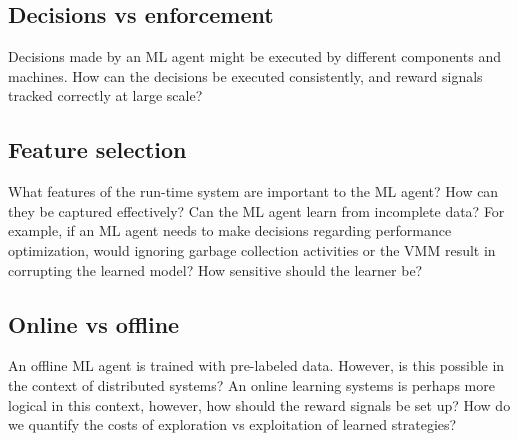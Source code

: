 \documentclass[a4paper,twocolumn]{article}
\begin{document}
\subsection{Decisions vs enforcement}
Decisions made by an ML agent might be executed by different components and
machines. How can the decisions be executed consistently, and reward signals
tracked correctly at large scale?

\subsection{Feature selection}
What features of the run-time system are important to the ML agent? How can they
be captured effectively? Can the ML agent learn from incomplete data? For
example, if an ML agent needs to make decisions regarding performance
optimization, would ignoring garbage collection activities or the VMM result in
corrupting the learned model? How sensitive should the learner be?

\subsection{Online vs offline}
An offline ML agent is trained with pre-labeled data. However, is this possible
in the context of distributed systems? An online learning systems is perhaps
more logical in this context, however, how should the reward signals be set up?
How do we quantify the costs of exploration vs exploitation of learned
strategies?
\end{document}
